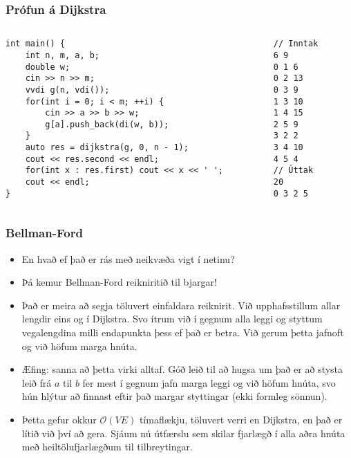 \documentclass{beamer}
\begin{document}
\begin{frame}[fragile]
\frametitle{Prófun á Dijkstra}

\begin{columns}
\begin{column}{0.7\textwidth}
\begin{small}
\begin{verbatim}
int main() {
    int n, m, a, b;
    double w;
    cin >> n >> m;
    vvdi g(n, vdi());
    for(int i = 0; i < m; ++i) {
        cin >> a >> b >> w;
        g[a].push_back(di(w, b));
    }
    auto res = dijkstra(g, 0, n - 1);
    cout << res.second << endl;
    for(int x : res.first) cout << x << ' ';
    cout << endl;
}
\end{verbatim}
\end{small}
\end{column}

\begin{column}{0.3\textwidth}
\begin{verbatim}
// Inntak
6 9
0 1 6
0 2 13
0 3 9
1 3 10
1 4 15
2 5 9
3 2 2
3 4 10
4 5 4
// Úttak
20
0 3 2 5
\end{verbatim}
\end{column}
\end{columns}

\end{frame}

\begin{frame}
\frametitle{Bellman-Ford}

\begin{itemize}

\item<1-> En hvað ef það er rás með neikvæða vigt í netinu?

\item<2-> Þá kemur Bellman-Ford reikniritið til bjargar!

\item<3-> Það er meira að segja töluvert einfaldara reiknirit. Við upphafsstillum allar lengdir eins og í Dijkstra. Svo ítrum við í gegnum alla leggi og styttum vegalengdina milli endapunkta þess ef það er betra. Við gerum þetta jafnoft og við höfum marga hnúta. 

\item<4-> Æfing: sanna að þetta virki alltaf. Góð leið til að hugsa um það er að stysta leið frá $a$ til $b$ fer mest í gegnum jafn marga leggi og við höfum hnúta, svo hún hlýtur að finnast eftir það margar styttingar (ekki formleg sönnun).

\item<5-> Þetta gefur okkur $\mathcal{O}(VE)$ tímaflækju, töluvert verri en Dijkstra, en það er lítið við því að gera. Sjáum nú útfærslu sem skilar fjarlægð í alla aðra hnúta með heiltölufjarlægðum til tilbreytingar.

\end{itemize}

\end{frame}
\end{document}

